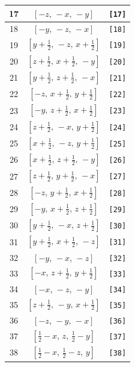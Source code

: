 \documentclass[fleqn,8pt]{jsarticle}
\begin{document}
\begin{longtable}{ccc}
17 & $\left[ - z,\, - x,\, - y \right]$ & {\tt [17]} \\ \hline
18 & $\left[ - y,\, - z,\, - x \right]$ & {\tt [18]} \\ \hline
19 & $\left[ y + \frac{1}{2},\, - z,\, x + \frac{1}{2} \right]$ & {\tt [19]} \\ \hline
20 & $\left[ z + \frac{1}{2},\, x + \frac{1}{2},\, - y \right]$ & {\tt [20]} \\ \hline
21 & $\left[ y + \frac{1}{2},\, z + \frac{1}{2},\, - x \right]$ & {\tt [21]} \\ \hline
22 & $\left[ - z,\, x + \frac{1}{2},\, y + \frac{1}{2} \right]$ & {\tt [22]} \\ \hline
23 & $\left[ - y,\, z + \frac{1}{2},\, x + \frac{1}{2} \right]$ & {\tt [23]} \\ \hline
24 & $\left[ z + \frac{1}{2},\, - x,\, y + \frac{1}{2} \right]$ & {\tt [24]} \\ \hline
25 & $\left[ x + \frac{1}{2},\, - z,\, y + \frac{1}{2} \right]$ & {\tt [25]} \\ \hline
26 & $\left[ x + \frac{1}{2},\, z + \frac{1}{2},\, - y \right]$ & {\tt [26]} \\ \hline
27 & $\left[ z + \frac{1}{2},\, y + \frac{1}{2},\, - x \right]$ & {\tt [27]} \\ \hline
28 & $\left[ - z,\, y + \frac{1}{2},\, x + \frac{1}{2} \right]$ & {\tt [28]} \\ \hline
29 & $\left[ - y,\, x + \frac{1}{2},\, z + \frac{1}{2} \right]$ & {\tt [29]} \\ \hline
30 & $\left[ y + \frac{1}{2},\, - x,\, z + \frac{1}{2} \right]$ & {\tt [30]} \\ \hline
31 & $\left[ y + \frac{1}{2},\, x + \frac{1}{2},\, - z \right]$ & {\tt [31]} \\ \hline
32 & $\left[ - y,\, - x,\, - z \right]$ & {\tt [32]} \\ \hline
33 & $\left[ - x,\, z + \frac{1}{2},\, y + \frac{1}{2} \right]$ & {\tt [33]} \\ \hline
34 & $\left[ - x,\, - z,\, - y \right]$ & {\tt [34]} \\ \hline
35 & $\left[ z + \frac{1}{2},\, - y,\, x + \frac{1}{2} \right]$ & {\tt [35]} \\ \hline
36 & $\left[ - z,\, - y,\, - x \right]$ & {\tt [36]} \\ \hline
37 & $\left[ \frac{1}{2} - x,\, z,\, \frac{1}{2} - y \right]$ & {\tt [37]} \\ \hline
38 & $\left[ \frac{1}{2} - x,\, \frac{1}{2} - z,\, y \right]$ & {\tt [38]} \\ \hline

\end{longtable}
\end{document}
